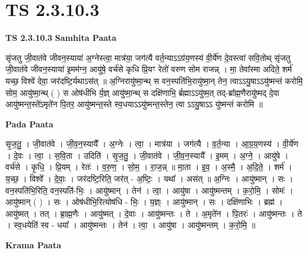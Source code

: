 \documentclass[17pt]{extarticle}
\begin{document}
\section*{ TS 2.3.10.3 }

\textbf{TS 2.3.10.3 } \newline
\textbf{Samhita Paata} \newline

सृ॑जतु जी॒वात॑वे जीवन॒स्याया॑ अ॒ग्नेस्त्वा॒ मात्र॑या॒ जग॑त्यै वर्त॒न्याऽऽग्र॑य॒णस्य॑ वी॒र्ये॑ण दे॒वस्त्वा॑ सवि॒तोथ् सृ॑जतु जी॒वात॑वे जीवन॒स्याया॑ इ॒मम॑ग्न॒ आयु॑षे॒ वर्च॑से कृधि प्रि॒यꣳ रेतो॑ वरुण सोम राजन्न् । मा॒ तेवा᳚स्मा अदिते॒ शर्म॑ यच्छ॒ विश्वे॑ देवा॒ जर॑दष्टि॒र्यथाऽस॑त् ॥ अ॒ग्निरायु॑ष्मा॒न्थ् स वन॒स्पति॑भि॒रायु॑ष्मा॒न् तेन॒ त्वाऽऽयु॒षाऽऽयु॑ष्मन्तं करोमि॒ सोम॒ आयु॑ष्मा॒न्थ् ( ) स ओष॑धीभि र्य॒ज्ञ् आयु॑ष्मा॒न्थ् स दक्षि॑णाभि॒ र्ब्रह्माऽऽयु॑ष्म॒त् तद्-ब्रा᳚ह्म॒णैरायु॑ष्मद् दे॒वा आयु॑ष्मन्त॒स्ते॑ऽमृते॑न पि॒तर॒ आयु॑ष्मन्त॒स्ते स्व॒धयाऽऽयु॑ष्मन्त॒स्तेन॒ त्वा ऽऽयु॒षाऽऽ यु॑ष्मन्तं करोमि ॥ \newline

\textbf{Pada Paata} \newline

सृ॒ज॒तु॒ । जी॒वात॑वे । जी॒व॒न॒स्यायै᳚ । अ॒ग्नेः । त्वा॒ । मात्र॑या । जग॑त्यै । व॒र्त॒न्या । आ॒ग्र॒य॒णस्य॑ । वी॒र्ये॑ण । दे॒वः । त्वा॒ । स॒वि॒ता । उदिति॑ । सृ॒ज॒तु॒ । जी॒वात॑वे । जी॒व॒न॒स्यायै᳚ । इ॒मम् । अ॒ग्ने॒ । आयु॑षे । वर्च॑से । कृ॒धि॒ । प्रि॒यम् । रेतः॑ । व॒रु॒ण॒ । सो॒म॒ । रा॒ज॒न्न् ॥ मा॒ता । इ॒व॒ । अ॒स्मै॒ । अ॒दि॒ते॒ । शर्म॑ । य॒च्छ॒ । विश्वे᳚ । दे॒वाः॒ । जर॑दष्टि॒रिति॒ जर॑त् - अ॒ष्टिः॒ । यथा᳚ । अस॑त् ॥ अ॒ग्निः । आयु॑ष्मान् । सः । वन॒स्पति॑भि॒रिति॒ वन॒स्पति॑-भिः॒ । आयु॑ष्मान् । तेन॑ । त्वा॒ । आयु॑षा । आयु॑ष्मन्तम् । क॒रो॒मि॒ । सोमः॑ । आयु॑ष्मान् ( ) । सः । ओष॑धीभि॒रित्योष॑धि - भिः॒ । य॒ज्ञ्ः । आयु॑ष्मान् । सः । दक्षि॑णाभिः । ब्रह्म॑ । आयु॑ष्मत् । तत् । ब्रा॒ह्म॒णैः । आयु॑ष्मत् । दे॒वाः । आयु॑ष्मन्तः । ते । अ॒मृते॑न । पि॒तरः॑ । आयु॑ष्मन्तः । ते । स्व॒धयेति॑ स्व - धया᳚ । आयु॑ष्मन्तः । तेन॑ । त्वा॒ । आयु॑षा । आयु॑ष्मन्तम् । क॒रो॒मि॒ ॥  \newline


\textbf{Krama Paata} \newline
\end{document}
